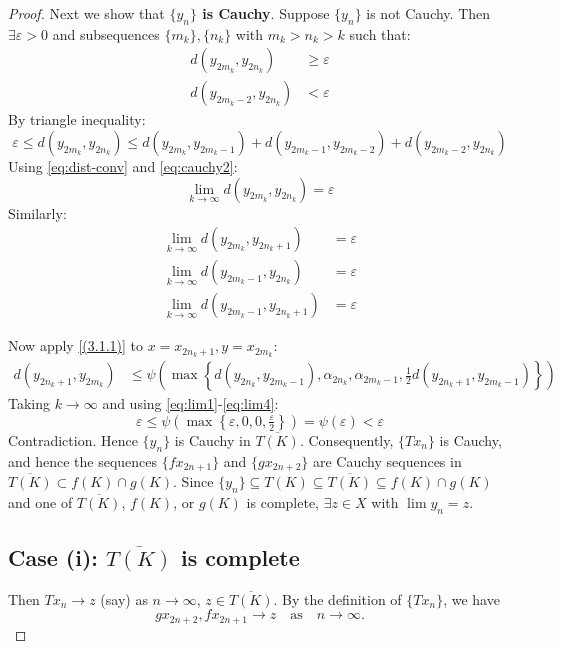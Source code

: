 \documentclass[10pt,a4paper]{amsart}
\begin{document}
\begin{proof}
Next we show that \textbf{$\{y_n\}$ is Cauchy}.
Suppose $\{y_n\}$ is not Cauchy. Then $\exists \varepsilon > 0$ and subsequences $\{m_k\}, \{n_k\}$ with $m_k > n_k > k$ such that:
\begin{align} 
d(y_{2m_k}, y_{2n_k}) &\geq \varepsilon \label{eq:cauchy1} \\
d(y_{2m_k-2}, y_{2n_k}) &< \varepsilon \label{eq:cauchy2}
\end{align}
By triangle inequality:
\[
\varepsilon \leq d(y_{2m_k}, y_{2n_k}) \leq d(y_{2m_k}, y_{2m_k-1}) + d(y_{2m_k-1}, y_{2m_k-2}) + d(y_{2m_k-2}, y_{2n_k})
\]
Using \eqref{eq:dist-conv} and \eqref{eq:cauchy2}:
\begin{equation} \label{eq:lim1}
\lim_{k \to \infty} d(y_{2m_k}, y_{2n_k}) = \varepsilon
\end{equation}
Similarly:
\begin{align}
\lim_{k \to \infty} d(y_{2m_k}, y_{2n_k+1}) &= \varepsilon \label{eq:lim2} \\
\lim_{k \to \infty} d(y_{2m_k-1}, y_{2n_k}) &= \varepsilon \label{eq:lim3} \\
\lim_{k \to \infty} d(y_{2m_k-1}, y_{2n_k+1}) &= \varepsilon \label{eq:lim4}
\end{align}

Now apply \eqref{(3.1.1)} to $x = x_{2n_k+1}, y = x_{2m_k}$:
\begin{align*}
d(y_{2n_k+1}, y_{2m_k}) &\leq \psi \left( \max \left\{ d(y_{2n_k}, y_{2m_k-1}), \alpha_{2n_k}, \alpha_{2m_k-1}, \tfrac{1}{2} d(y_{2n_k+1}, y_{2m_k-1}) \right\} \right)
\end{align*}
Taking $k \to \infty$ and using \eqref{eq:lim1}-\eqref{eq:lim4}:
\[
\varepsilon \leq \psi \left( \max \left\{ \varepsilon, 0, 0, \tfrac{\varepsilon}{2} \right\} \right) = \psi(\varepsilon) < \varepsilon
\]
Contradiction. Hence $\{y_n\}$ is Cauchy in $\overline{T(K)}$. Consequently, $\{Tx_n\}$ is Cauchy, and hence the sequences $\{fx_{2n+1}\}$ and $\{gx_{2n+2}\}$ are Cauchy sequences in $\overline{T(K)} \subset f(K) \cap g(K)$. Since $\{y_n\} \subseteq T(K) \subseteq \overline{T(K)} \subseteq f(K) \cap g(K)$ and one of $\overline{T(K)}$, $f(K)$, or $g(K)$ is complete, $\exists z \in X$ with $\lim y_n = z$.

\subsection*{Case (i): $\overline{T(K)}$ is complete}
Then $Tx_n \to z$ (say) as $n\to\infty$, $z\in\overline{T(K)}$. By the definition of $\{Tx_n\}$, we have
\[
gx_{2n+2}, fx_{2n+1} \to z \quad \text{as} \quad n\to\infty.
\]


\end{proof}
\end{document}
